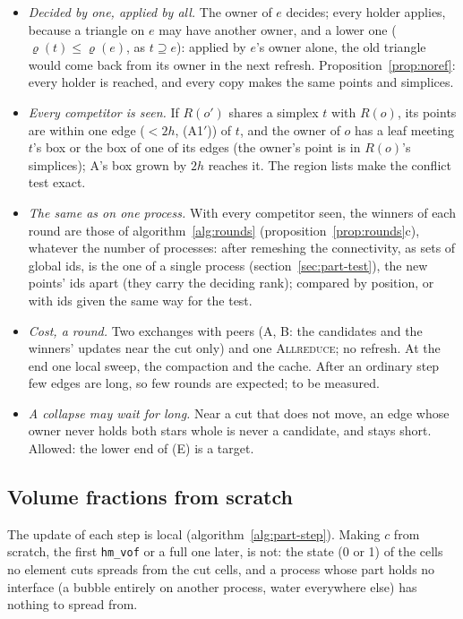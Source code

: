 \documentclass[10pt,a4paper]{article}
\theoremstyle{definition}
\newcommand{\fn}[1]{\texttt{#1}}
\begin{document}
\begin{itemize}
  \item \emph{Decided by one, applied by all.} The owner of $e$ decides;
    every holder applies, because a triangle on $e$ may have another
    owner, and a lower one ($\varrho(t) \le \varrho(e)$, as $t \supseteq
    e$): applied by $e$'s owner alone, the old triangle would come back
    from its owner in the next refresh. Proposition~\ref{prop:noref}:
    every holder is reached, and every copy makes the same points and
    simplices.
  \item \emph{Every competitor is seen.} If $R(o')$ shares a simplex $t$
    with $R(o)$, its points are within one edge ($< 2h$, (A1$'$)) of $t$,
    and the owner of $o$ has a leaf meeting $t$'s box or the box of one of
    its edges (the owner's point is in $R(o)$'s simplices); A's box grown
    by $2h$ reaches it. The region lists make the conflict test exact.
  \item \emph{The same as on one process.} With every competitor seen,
    the winners of each round are those of algorithm~\ref{alg:rounds}
    (proposition~\ref{prop:rounds}c), whatever the number of processes:
    after remeshing the connectivity, as sets of global ids, is the one of
    a single process (section~\ref{sec:part-test}), the new points' ids
    apart (they carry the deciding rank); compared by position, or with
    ids given the same way for the test.
  \item \emph{Cost, a round.} Two exchanges with peers (A, B: the
    candidates and the winners' updates near the cut only) and one
    \textsc{Allreduce}; no refresh. At the end one local sweep, the
    compaction and the cache. After an ordinary step few edges are long,
    so few rounds are expected; to be measured.
  \item \emph{A collapse may wait for long.} Near a cut that does not
    move, an edge whose owner never holds both stars whole is never a
    candidate, and stays short. Allowed: the lower end of (E) is a
    target.
\end{itemize}

\subsection{Volume fractions from scratch}

The update of each step is local (algorithm~\ref{alg:part-step}). Making
$c$ from scratch, the first \fn{hm\_vof} or a full one later, is not: the
state (0 or 1) of the cells no element cuts spreads from the cut cells, and
a process whose part holds no interface (a bubble entirely on another
process, water everywhere else) has nothing to spread from.
\end{document}
